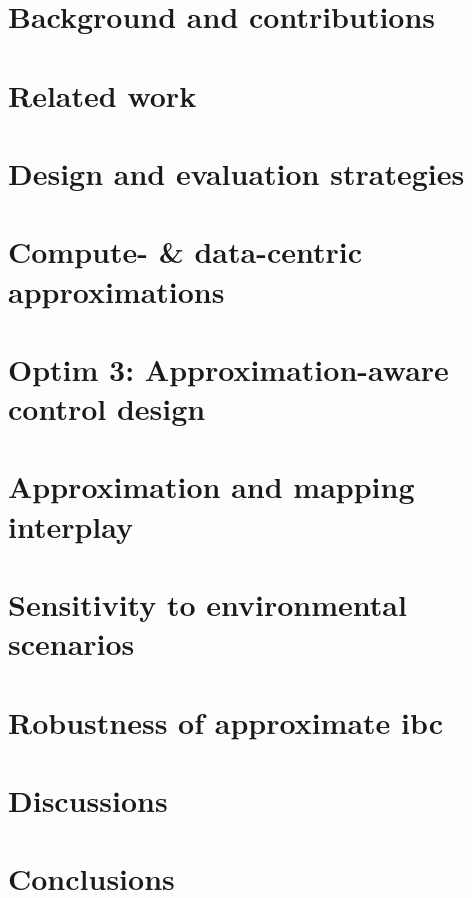 

\section{Background and contributions}


\section{Related work}




\section{Design and evaluation strategies}


\section{Compute- \& data-centric approximations}
\label{cross_layer_approx}


\section{Optim 3: Approximation-aware control design}
\label{lqg_control}


\section{Approximation and mapping interplay}
\label{mappings}


\section{Sensitivity to environmental scenarios}
\label{robust}


\section{Robustness of approximate \texorpdfstring{\gls{ibc}}{IBC}}\label{failure}


\section{Discussions}


\section{Conclusions}
